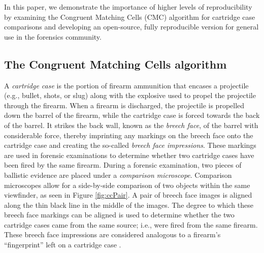 \documentclass[11pt,]{isuthesis}
\begin{document}
In this paper, we demonstrate the importance of higher levels of reproducibility by examining the Congruent Matching Cells (CMC) algorithm for cartridge case comparisons and developing an open-source, fully reproducible version for general use in the forensics community.

\hypertarget{the-congruent-matching-cells-algorithm}{%
\subsection{The Congruent Matching Cells algorithm}\label{the-congruent-matching-cells-algorithm}}

A \emph{cartridge case} is the portion of firearm ammunition that encases a projectile (e.g., bullet, shots, or slug) along with the explosive used to propel the projectile through the firearm.
When a firearm is discharged, the projectile is propelled down the barrel of the firearm, while the cartridge case is forced towards the back of the barrel.
It strikes the back wall, known as the \emph{breech face}, of the barrel with considerable force, thereby imprinting any markings on the breech face onto the cartridge case and creating the so-called \emph{breech face impressions}.
These markings are used in forensic examinations to determine whether two cartridge cases have been fired by the same firearm.
During a forensic examination, two pieces of ballistic evidence are placed under a \emph{comparison microscope}.
Comparison microscopes allow for a side-by-side comparison of two objects within the same viewfinder, as seen in Figure \ref{fig:ccPair}.
A pair of breech face images is aligned along the thin black line in the middle of the images.
The degree to which these breech face markings can be aligned is used to determine whether the two cartridge cases came from the same source; i.e., were fired from the same firearm.
These breech face impressions are considered analogous to a firearm's ``fingerprint'' left on a cartridge case \citep{Thompson2017}.
\end{document}
